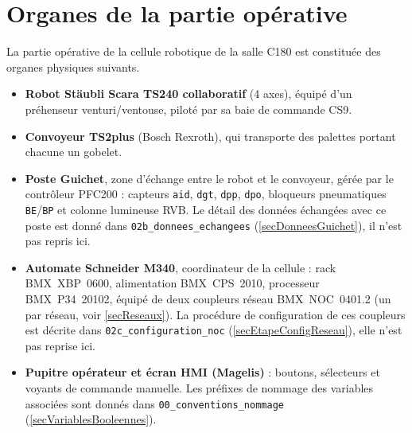 \section{Organes de la partie opérative}
\label{secOrganes}

La partie opérative de la cellule robotique de la salle C180 est constituée
des organes physiques suivants.

\begin{itemize}
    \item \textbf{Robot Stäubli Scara TS240 collaboratif} (4 axes), équipé
    d'un préhenseur venturi/ventouse, piloté par sa baie de commande CS9.

    \item \textbf{Convoyeur TS2plus} (Bosch Rexroth), qui transporte des
    palettes portant chacune un gobelet.

    \item \textbf{Poste Guichet}, zone d'échange entre le robot et le
    convoyeur, gérée par le contrôleur PFC200 : capteurs \texttt{aid},
    \texttt{dgt}, \texttt{dpp}, \texttt{dpo}, bloqueurs pneumatiques
    \texttt{BE}/\texttt{BP} et colonne lumineuse RVB. Le détail des données
    échangées avec ce poste est donné dans \texttt{02b\_donnees\_echangees}
    (\ref{secDonneesGuichet}), il n'est pas repris ici.

    \item \textbf{Automate Schneider M340}, coordinateur de la cellule :
    rack BMX~XBP~0600, alimentation BMX~CPS~2010, processeur
    BMX~P34~20102, équipé de deux coupleurs réseau BMX~NOC~0401.2 (un par
    réseau, voir \ref{secReseaux}). La procédure de configuration de ces
    coupleurs est décrite dans \texttt{02c\_configuration\_noc}
    (\ref{secEtapeConfigReseau}), elle n'est pas reprise ici.

    \item \textbf{Pupitre opérateur et écran HMI (Magelis)} : boutons,
    sélecteurs et voyants de commande manuelle. Les préfixes de nommage des
    variables associées sont donnés dans \texttt{00\_conventions\_nommage}
    (\ref{secVariablesBooleennes}).
\end{itemize}
